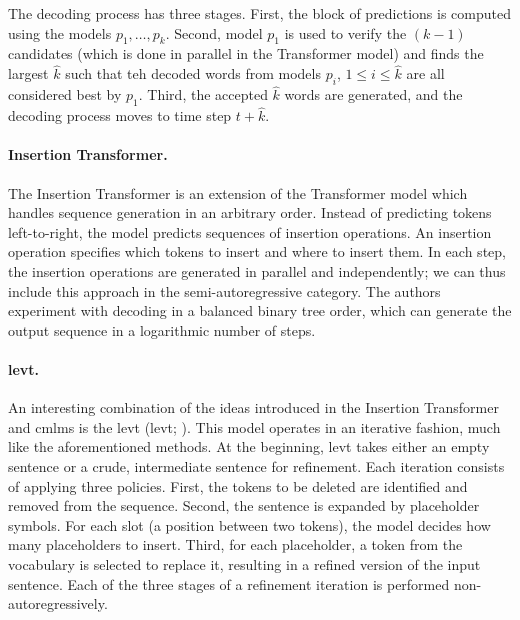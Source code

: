 The decoding process has three stages. First, the block of predictions is
computed using the models $p_1, \ldots, p_k$. Second, model $p_1$ is used to
verify the $(k-1)$ candidates (which is done in parallel in the Transformer
model) and finds the largest $\hat{k}$ such that teh decoded words from models
$p_i$, $1 \leq i \leq \hat{k}$ are all considered best by $p_1$. Third, the
accepted $\hat{k}$ words are generated, and the decoding process moves to time
step $t + \hat{k}$.

\paragraph{Insertion Transformer.} The Insertion Transformer
\citep{stern-etal-2019-insertion} is an extension of the Transformer model
which handles sequence generation in an arbitrary order. Instead of predicting
tokens left-to-right, the model predicts sequences of insertion operations. An
insertion operation specifies which tokens to insert and where to insert
them. In each step, the insertion operations are generated in parallel and
independently; we can thus include this approach in the semi-autoregressive
category. The authors experiment with decoding in a balanced binary tree order,
which can generate the output sequence in a logarithmic number of steps.

\paragraph{\acl{levt}.} An interesting combination of the ideas introduced in
the Insertion Transformer and \acp{cmlm} is the \acl{levt}
(\acs{levt}; \citealp{gu-etal-2019-levenshtein}). This model
operates in an iterative fashion, much like the aforementioned methods. At the
beginning, \ac{levt} takes either an empty sentence or a crude, intermediate
sentence for refinement. Each iteration consists of applying three
policies. First, the tokens to be deleted are identified and removed from the
sequence. Second, the sentence is expanded by placeholder symbols. For each
slot (a position between two tokens), the model decides how many placeholders
to insert. Third, for each placeholder, a token from the vocabulary is selected
to replace it, resulting in a refined version of the input sentence.  Each of
the three stages of a refinement iteration is performed non-autoregressively.

